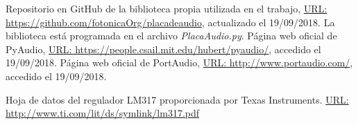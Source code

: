 \documentclass[a4paper,11pt]{article}
\begin{document}
\clearpage

\begin{thebibliography}{99}

	 Repositorio en GitHub de la biblioteca propia utilizada en el trabajo, \href{https://github.com/fotonicaOrg/placadeaudio}{URL: https://github.com/fotonicaOrg/placadeaudio}, actualizado el 19/09/2018. La biblioteca está programada en el archivo \emph{PlacaAudio.py}.
	 Página web oficial de PyAudio, \href{https://people.csail.mit.edu/hubert/pyaudio/}{URL: https://people.csail.mit.edu/hubert/pyaudio/}, accedido el 19/09/2018.
	 Página web oficial de PortAudio, \href{http://www.portaudio.com/}{URL: http://www.portaudio.com/}, accedido el 19/09/2018.
	
	 Hoja de datos del regulador LM317 proporcionada por Texas Instruments.  \href{http://www.ti.com/lit/ds/symlink/lm317.pdf}{URL: http://www.ti.com/lit/ds/symlink/lm317.pdf}

\end{thebibliography}
\end{document}
